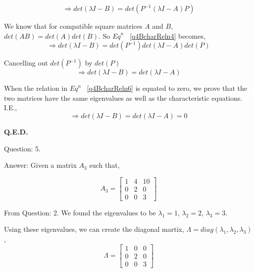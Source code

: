 \documentclass[a4paper]{article}
\begin{document}
\begin{qalist}
			\begin{equation}\label{q4BcharReln4}
				\Rightarrow  det(\lambda I - B) =  det({P}^{-1} (\lambda I - A) P) 
			\end{equation}
			
			We know that for compatible square matrices $A$ and $B$, $det(AB) = det(A)det(B)$. So ${Eq}^{n}$ ~\ref{q4BcharReln4} becomes, 
			\begin{equation}\label{q4BcharReln5}
				\Rightarrow  det(\lambda I - B) =  det({P}^{-1}) det(\lambda I - A) det(P) 
			\end{equation}
			
			Cancelling out $ det({P}^{-1})$ by $det(P)$
			\begin{equation}\label{q4BcharReln6}
				\Rightarrow  det(\lambda I - B) =  det(\lambda I - A)
			\end{equation}
			
			When the relation in ${Eq}^{n}$ ~\ref{q4BcharReln6} is equated to zero, we prove that the two matrices have the same eigenvalues as well as the characteristic equations. I.E.,
			\begin{equation}\label{q4BcharReln6}
				\Rightarrow  det(\lambda I - B) =  det(\lambda I - A) = 0
			\end{equation}
			
			\textbf{Q.E.D.}

		\item[Question: 5.] \setcounter{equation}{0}
		\item[Answer:] Given a matrix ${A}_{3}$ such that,
		
			\begin{equation} \label{q5Given}
				{A}_{3} = \begin{bmatrix}1 & 4 & 10 \\ 0 & 2 & 0 \\ 0 & 0 & 3\end{bmatrix}
			\end{equation}
			
			From Question: 2. We found the eigenvalues to be ${\lambda}_{1} = 1$, ${\lambda}_{2} = 2$, ${\lambda}_{3} = 3$. 
			
			Using these eigenvalues, we can create the diagonal martix, $\Lambda = diag({\lambda}_{1}, {\lambda}_{2}, {\lambda}_{3})$,
			\begin{equation}\label{q5DiagMat}
				\Lambda = \begin{bmatrix}1 & 0 & 0 \\ 0 & 2 & 0 \\ 0 & 0 & 3\end{bmatrix}
			\end{equation}
			

\end{qalist}
\end{document}

